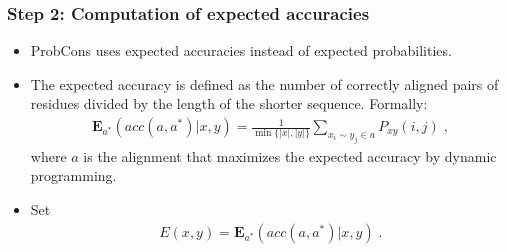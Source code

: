 \begin{frame}
    \frametitle{Step 2: Computation of expected accuracies}
    \begin{itemize}
        \item ProbCons uses expected accuracies instead of expected probabilities.
        \item The expected accuracy is defined as the number of correctly aligned pairs of residues divided by the length of the shorter sequence. Formally:
        \begin{align*}
            \pmb{E}_{a^*} (acc(a,a^*)|x,y) = \frac{1}{\min{\{|x|,|y|\}}} \sum_{x_i\sim y_j \in a} P_{xy}(i,j) \;,
        \end{align*}
        where $a$ is the alignment that maximizes the expected accuracy by dynamic programming.
        \item Set 
        \begin{align}\label{eq:score}
            E(x,y) = \pmb{E}_{a^*} (acc(a,a^*)|x,y) \;.
        \end{align}
    \end{itemize}
\end{frame}


